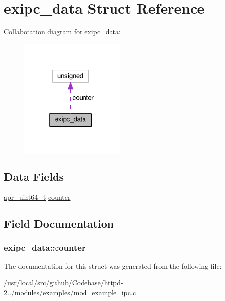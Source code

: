 \hypertarget{structexipc__data}{}\section{exipc\+\_\+data Struct Reference}
\label{structexipc__data}


Collaboration diagram for exipc\+\_\+data\+:
\nopagebreak
\begin{figure}[H]
\begin{center}
\leavevmode
\includegraphics[width=148pt]{structexipc__data__coll__graph}
\end{center}
\end{figure}
\subsection*{Data Fields}
\begin{DoxyCompactItemize}
\item 
\hyperlink{group__apr__platform_ga722b277a42230f3fd41cb5be7a76cfb4}{apr\+\_\+uint64\+\_\+t} \hyperlink{structexipc__data_a15df2f5398e612552464fc8bda5df974}{counter}
\end{DoxyCompactItemize}


\subsection{Field Documentation}
\subsubsection[{\texorpdfstring{counter}{counter}}]{ exipc\+\_\+data\+::counter}\hypertarget{structexipc__data_a15df2f5398e612552464fc8bda5df974}{}\label{structexipc__data_a15df2f5398e612552464fc8bda5df974}


The documentation for this struct was generated from the following file\+:\begin{DoxyCompactItemize}
\item 
/usr/local/src/github/\+Codebase/httpd-\/2../modules/examples/\hyperlink{mod__example__ipc_8c}{mod\+\_\+example\+\_\+ipc.\+c}\end{DoxyCompactItemize}
